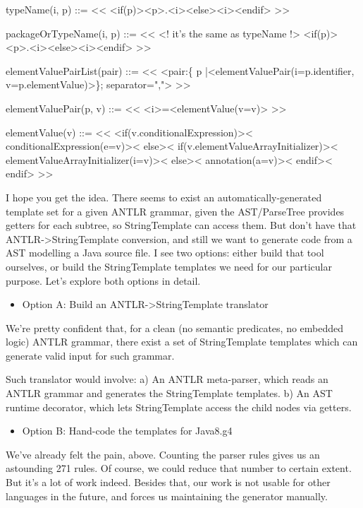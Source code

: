 \documentclass[11pt]{article}
\begin{document}
typeName(i, p) ::= <<
<if(p)><p>.<i><else><i><endif>
>>

packageOrTypeName(i, p) ::= << <! it's the same as typeName !>
<if(p)><p>.<i><else><i><endif>
>>

elementValuePairList(pair) ::= <<
<pair:\{ p |<elementValuePair(i=p.identifier, v=p.elementValue)>\}; separator=",">
>>

elementValuePair(p, v) ::= <<
<i>=<elementValue(v=v)>
>>

elementValue(v) ::= <<
<if(v.conditionalExpression)><
  conditionalExpression(e=v)><
else><
  if(v.elementValueArrayInitializer)><
    elementValueArrayInitializer(i=v)><
  else><
    annotation(a=v)><
  endif><
endif>
>>

I hope you get the idea. There seems to exist an automatically-generated template set for a given ANTLR grammar, given the AST/ParseTree
provides getters for each subtree, so StringTemplate can access them.
But don't have that ANTLR->StringTemplate conversion, and still we want to generate code from a AST modelling a Java source file.
I see two options: either build that tool ourselves, or build the StringTemplate templates we need for our particular purpose.
Let's explore both options in detail.

\begin{itemize}
\item Option A: Build an ANTLR->StringTemplate translator
\end{itemize}

We're pretty confident that, for a clean (no semantic predicates, no embedded logic) ANTLR grammar, there exist a
set of StringTemplate templates which can generate valid input for such grammar.

Such translator would involve:
a) An ANTLR meta-parser, which reads an ANTLR grammar and generates the StringTemplate templates.
b) An AST runtime decorator, which lets StringTemplate access the child nodes via getters.

\begin{itemize}
\item Option B: Hand-code the templates for Java8.g4
\end{itemize}

We've already felt the pain, above. Counting the parser rules gives us an astounding 271 rules. Of course, we could
reduce that number to certain extent. But it's a lot of work indeed. Besides that, our work is not usable for other languages
in the future, and forces us maintaining the generator manually.
\end{document}
